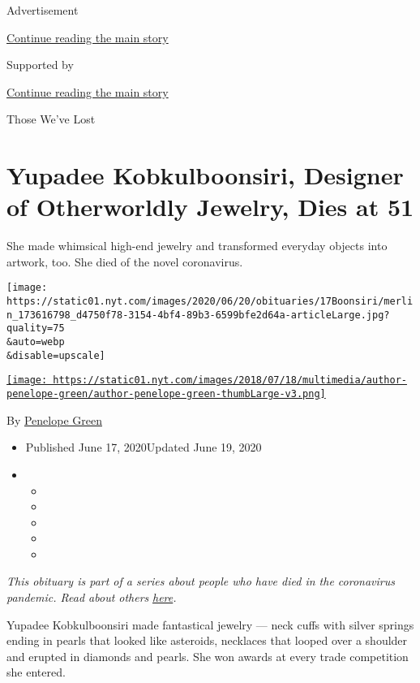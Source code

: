 Advertisement

\protect\hyperlink{after-top}{Continue reading the main story}

Supported by

\protect\hyperlink{after-sponsor}{Continue reading the main story}

Those We've Lost

\hypertarget{yupadee-kobkulboonsiri-designer-of-otherworldly-jewelry-dies-at-51}{%
\section{Yupadee Kobkulboonsiri, Designer of Otherworldly Jewelry, Dies
at
51}\label{yupadee-kobkulboonsiri-designer-of-otherworldly-jewelry-dies-at-51}}

She made whimsical high-end jewelry and transformed everyday objects
into artwork, too. She died of the novel coronavirus.

\texttt{[image: https://static01.nyt.com/images/2020/06/20/obituaries/17Boonsiri/merlin\_173616798\_d4750f78-3154-4bf4-89b3-6599bfe2d64a-articleLarge.jpg?quality=75\\\&auto=webp\\\&disable=upscale]}

\href{https://www.nytimes.com/by/penelope-green}{\texttt{[image: https://static01.nyt.com/images/2018/07/18/multimedia/author-penelope-green/author-penelope-green-thumbLarge-v3.png]}}

By \href{https://www.nytimes.com/by/penelope-green}{Penelope Green}

\begin{itemize}
\item
  Published June 17, 2020Updated June 19, 2020
\item
  \begin{itemize}
  \item
  \item
  \item
  \item
  \item
  \end{itemize}
\end{itemize}

\emph{This obituary is part of a series about people who have died in
the coronavirus pandemic. Read about others}
\href{https://www.nytimes.com/interactive/2020/obituaries/people-died-coronavirus-obituaries.html}{\emph{here}}\emph{.}

Yupadee Kobkulboonsiri made fantastical jewelry --- neck cuffs with
silver springs ending in pearls that looked like asteroids, necklaces
that looped over a shoulder and erupted in diamonds and pearls. She won
awards at every trade competition she entered.

